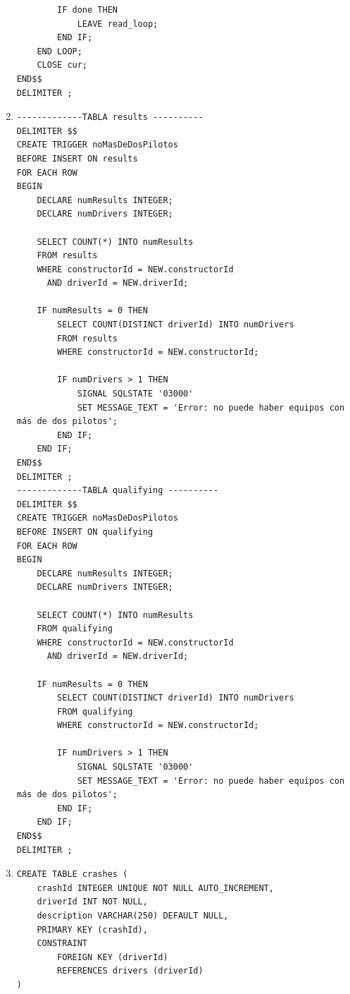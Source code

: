 \documentclass[a4paper]{article}
\begin{document}
\begin{enumerate}
\begin{verbatim}
        IF done THEN
            LEAVE read_loop;
        END IF;
    END LOOP;
    CLOSE cur;
END$$
DELIMITER ;
    \end{verbatim} 
    
    \item 
    \begin{verbatim}    
-------------TABLA results ----------
DELIMITER $$
CREATE TRIGGER noMasDeDosPilotos
BEFORE INSERT ON results
FOR EACH ROW
BEGIN
    DECLARE numResults INTEGER;
    DECLARE numDrivers INTEGER;
    
    SELECT COUNT(*) INTO numResults
    FROM results
    WHERE constructorId = NEW.constructorId
      AND driverId = NEW.driverId;
      
    IF numResults = 0 THEN
        SELECT COUNT(DISTINCT driverId) INTO numDrivers
        FROM results
        WHERE constructorId = NEW.constructorId;

        IF numDrivers > 1 THEN
            SIGNAL SQLSTATE '03000'
            SET MESSAGE_TEXT = 'Error: no puede haber equipos con más de dos pilotos';
        END IF;
    END IF;
END$$
DELIMITER ;
-------------TABLA qualifying ----------
DELIMITER $$
CREATE TRIGGER noMasDeDosPilotos
BEFORE INSERT ON qualifying
FOR EACH ROW
BEGIN
    DECLARE numResults INTEGER;
    DECLARE numDrivers INTEGER;
    
    SELECT COUNT(*) INTO numResults
    FROM qualifying
    WHERE constructorId = NEW.constructorId
      AND driverId = NEW.driverId;
      
    IF numResults = 0 THEN
        SELECT COUNT(DISTINCT driverId) INTO numDrivers
        FROM qualifying
        WHERE constructorId = NEW.constructorId;

        IF numDrivers > 1 THEN
            SIGNAL SQLSTATE '03000'
            SET MESSAGE_TEXT = 'Error: no puede haber equipos con más de dos pilotos';
        END IF;
    END IF;
END$$
DELIMITER ;
    \end{verbatim}
    
    \item 
    \begin{verbatim}
CREATE TABLE crashes (
   	crashId INTEGER UNIQUE NOT NULL AUTO_INCREMENT,
    driverId INT NOT NULL,
    description VARCHAR(250) DEFAULT NULL,
  	PRIMARY KEY (crashId),
	CONSTRAINT
		FOREIGN KEY (driverId)
		REFERENCES drivers (driverId)
)


\end{verbatim}
\end{enumerate}
\end{document}

